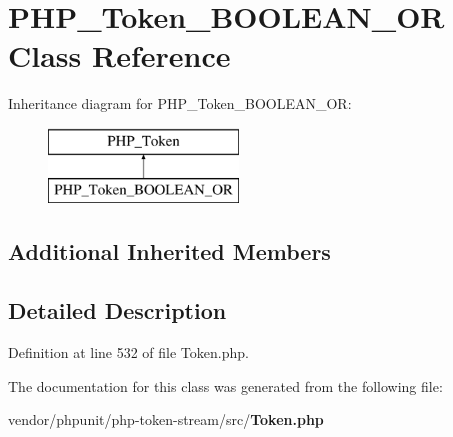 \section{P\+H\+P\+\_\+\+Token\+\_\+\+B\+O\+O\+L\+E\+A\+N\+\_\+\+O\+R Class Reference}
\label{class_p_h_p___token___b_o_o_l_e_a_n___o_r}
Inheritance diagram for P\+H\+P\+\_\+\+Token\+\_\+\+B\+O\+O\+L\+E\+A\+N\+\_\+\+O\+R\+:\begin{figure}[H]
\begin{center}
\leavevmode
\includegraphics[height=2.000000cm]{class_p_h_p___token___b_o_o_l_e_a_n___o_r}
\end{center}
\end{figure}
\subsection*{Additional Inherited Members}


\subsection{Detailed Description}


Definition at line 532 of file Token.\+php.



The documentation for this class was generated from the following file\+:\begin{DoxyCompactItemize}
\item 
vendor/phpunit/php-\/token-\/stream/src/{\bf Token.\+php}\end{DoxyCompactItemize}
